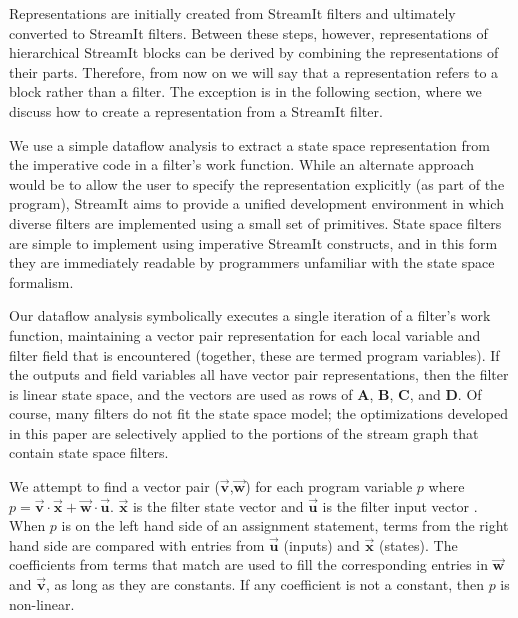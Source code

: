 Representations are initially created from StreamIt filters and
ultimately converted to StreamIt filters. Between these steps,
however, representations of hierarchical StreamIt blocks can be
derived by combining the representations of their parts.  Therefore,
from now on we will say that a representation refers to a block rather
than a filter. The exception is in the following section, where we
discuss how to create a representation from a StreamIt filter.


We use a simple dataflow analysis to extract a state space
representation from the imperative code in a filter's work function.
While an alternate approach would be to allow the user to specify the
representation explicitly (as part of the program), StreamIt aims to
provide a unified development environment in which diverse filters are
implemented using a small set of primitives.  State space filters are
simple to implement using imperative StreamIt constructs, and in this
form they are immediately readable by programmers unfamiliar with the
state space formalism.

Our dataflow analysis symbolically executes a single iteration of a
filter's work function, maintaining a vector pair representation for
each local variable and filter field that is encountered (together,
these are termed program variables). If the outputs and field
variables all have vector pair representations, then the filter is
linear state space, and the vectors are used as rows of $\mathbf{A}$,
$\mathbf{B}$, $\mathbf{C}$, and $\mathbf{D}$.  Of course, many filters
do not fit the state space model; the optimizations developed in this
paper are selectively applied to the portions of the stream graph that
contain state space filters.

We attempt to find a vector pair
($\vec{\mathbf{v}}$,$\vec{\mathbf{w}}$) for each program variable $p$
where $p = \vec{\mathbf{v}} \cdot \vec{\mathbf{x}} + \vec{\mathbf{w}}
\cdot \vec{\mathbf{u}}$.  $\vec{\mathbf{x}}$ is the filter state
vector and $\vec{\mathbf{u}}$ is the filter input vector .  When $p$
is on the left hand side of an assignment statement, terms from the
right hand side are compared with entries from $\vec{\mathbf{u}}$
(inputs) and $\vec{\mathbf{x}}$ (states). The coefficients from terms
that match are used to fill the corresponding entries in
$\vec{\mathbf{w}}$ and $\vec{\mathbf{v}}$, as long as they are
constants. If any coefficient is not a constant, then $p$ is
non-linear.

